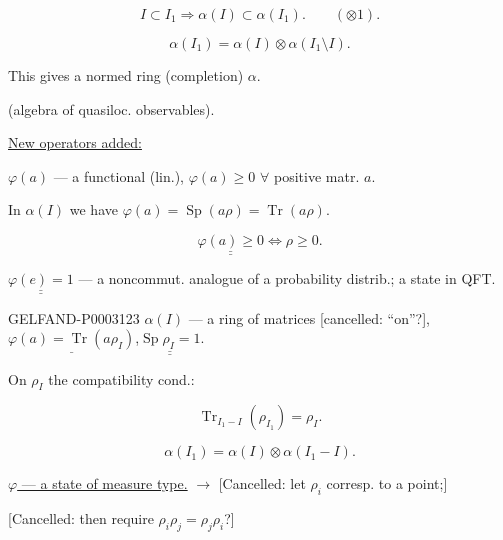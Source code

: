 \begin{equation*}I\subset I_1\Rightarrow\alpha (I)\subset\alpha (I_1).\qquad (\otimes1).\end{equation*}





\begin{equation*}\alpha (I_1)=\alpha (I)\otimes\alpha (I_1\setminus I).\end{equation*}

This gives a normed ring (completion) $\alpha$.

(algebra of quasiloc. observables).

\uline{New operators added:}

$\varphi (a)$ --- a functional (lin.), $\varphi (a)\ge0$ $\forall$ positive matr. $a$.

In $\alpha (I)$ we have $\varphi (a)=\operatorname{Sp}(a\rho)=\operatorname{Tr}(a\rho)$.

\begin{equation*}\underline{\underline{\varphi (a)\ge0}}\Longleftrightarrow\rho\ge0.\end{equation*}

$\underline{\underline{\varphi (e)=1}}$ --- a noncommut. analogue of a probability distrib.; a state in QFT.

\begin{GelfandAdjacentEvidence}{GELFAND-P000312}{3}
$\alpha (I)$ --- a ring of matrices [cancelled: “on”?], $\underline{\varphi (a)=\operatorname{Tr}(a\rho_I)}$,\quad $\underline{\underline{\operatorname{Sp}\rho_I=1}}$.

\end{GelfandAdjacentEvidence}


On $\rho_I$ the compatibility cond.:

\begin{equation*}\operatorname{Tr}_{I_1-I}(\rho_{I_1})=\rho_I.\end{equation*}

\begin{equation*}\alpha (I_1)=\alpha (I)\otimes\alpha (I_1-I).\end{equation*}

\uline{$\varphi$ --- a state of measure type.} $\longrightarrow$ [Cancelled: let $\rho_i$ corresp. to a point;]

[Cancelled: then require $\rho_i\rho_j=\rho_j\rho_i$?]

